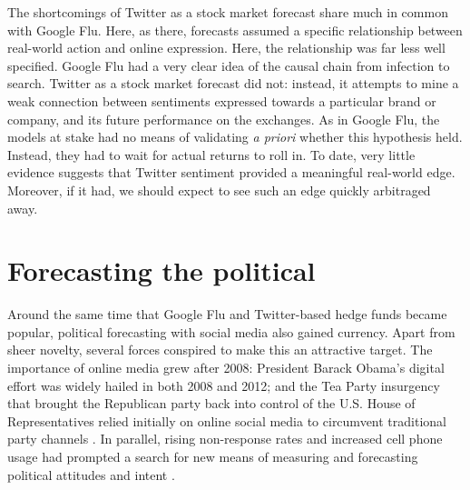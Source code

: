 \documentclass{article}
\begin{document}
The shortcomings of Twitter as a stock market forecast share much in
common with Google Flu. Here, as there, forecasts assumed a specific
relationship between real-world action and online expression. Here,
the relationship was far less well specified. Google Flu had a very
clear idea of the causal chain from infection to search. Twitter as a
stock market forecast did not: instead, it attempts to mine a weak
connection between sentiments expressed towards a particular brand or
company, and its future performance on the exchanges. As in Google
Flu, the models at stake had no means of validating \textit{a priori}
whether this hypothesis held. Instead, they had to wait for actual
returns to roll in. To date, very little evidence suggests that
Twitter sentiment provided a meaningful real-world edge. Moreover, if
it had, we should expect to see such an edge quickly arbitraged away.



\section{Forecasting the political}
\label{sec:forec-polit}


Around the same time that Google Flu and Twitter-based hedge funds
became popular, political forecasting with social media also gained
currency. Apart from sheer novelty, several forces conspired to make
this an attractive target. The importance of online media grew after
2008: President Barack Obama's digital effort was widely hailed in
both 2008 and 2012; and the Tea Party insurgency that brought the
Republican party back into control of the U.S. House of
Representatives relied initially on online social media to circumvent
traditional party channels \citep{williamson2011tea}. In parallel,
rising non-response rates and increased cell phone usage had prompted
a search for new means of measuring and forecasting political
attitudes and intent
\citep{keeter2006gauging,kohut2012assessing,christian2010assessing,boyle2013sampling,viera2013mail}.
\end{document}
